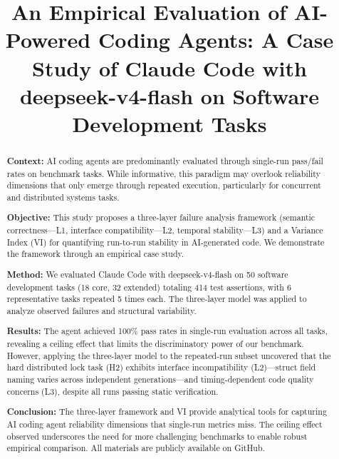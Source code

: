 \documentclass[conference]{IEEEtran}
\begin{document}
\title{An Empirical Evaluation of AI-Powered Coding Agents: A Case Study of Claude Code with deepseek-v4-flash on Software Development Tasks}

\author{
}

\maketitle

\begin{abstract}
\textbf{Context:} AI coding agents are predominantly evaluated through single-run pass/fail rates on benchmark tasks. While informative, this paradigm may overlook reliability dimensions that only emerge through repeated execution, particularly for concurrent and distributed systems tasks.

\textbf{Objective:} This study proposes a three-layer failure analysis framework (semantic correctness---L1, interface compatibility---L2, temporal stability---L3) and a Variance Index (VI) for quantifying run-to-run stability in AI-generated code. We demonstrate the framework through an empirical case study.

\textbf{Method:} We evaluated Claude Code with deepseek-v4-flash on 50 software development tasks (18 core, 32 extended) totaling 414 test assertions, with 6 representative tasks repeated 5 times each. The three-layer model was applied to analyze observed failures and structural variability.

\textbf{Results:} The agent achieved 100\% pass rates in single-run evaluation across all tasks, revealing a ceiling effect that limits the discriminatory power of our benchmark. However, applying the three-layer model to the repeated-run subset uncovered that the hard distributed lock task (H2) exhibits interface incompatibility (L2)---struct field naming varies across independent generations---and timing-dependent code quality concerns (L3), despite all runs passing static verification.

\textbf{Conclusion:} The three-layer framework and VI provide analytical tools for capturing AI coding agent reliability dimensions that single-run metrics miss. The ceiling effect observed underscores the need for more challenging benchmarks to enable robust empirical comparison. All materials are publicly available on GitHub.
\end{abstract}
\end{document}
